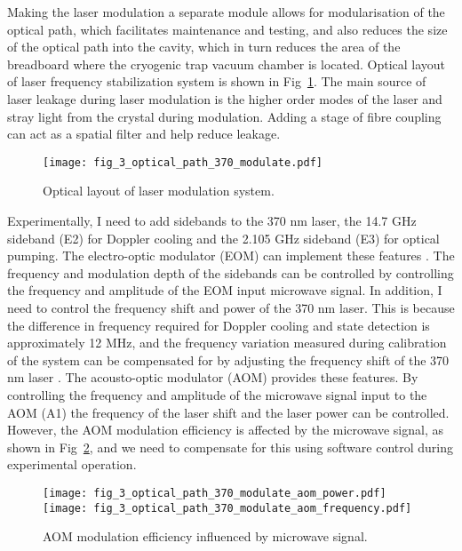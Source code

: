 Making the laser modulation a separate module allows for modularisation of the optical path, which facilitates maintenance and testing, and also reduces the size of the optical path into the cavity, which in turn reduces the area of the breadboard where the cryogenic trap vacuum chamber is located. Optical layout of laser frequency stabilization system \cite{RN147,RN149,RN146} is shown in Fig~\ref{fig:fig_3_optical_path_370_modulate}. The main source of laser leakage during laser modulation is the higher order modes of the laser and stray light from the crystal during modulation. Adding a stage of fibre coupling can act as a spatial filter and help reduce leakage.

\begin{figure}
    \centering
    \texttt{[image: fig\_3\_optical\_path\_370\_modulate.pdf]}
    \caption{Optical layout of laser modulation system.}
    \label{fig:fig_3_optical_path_370_modulate}
\end{figure}

Experimentally, I need to add sidebands to the 370 nm laser, the 14.7 GHz sideband (E2) for Doppler cooling and the 2.105 GHz sideband (E3) for optical pumping. The electro-optic modulator (EOM) can implement these features \cite{RN205,RN230,RN277}. The frequency and modulation depth of the sidebands can be controlled by controlling the frequency and amplitude of the EOM input microwave signal. In addition, I need to control the frequency shift and power of the 370 nm laser. This is because the difference in frequency required for Doppler cooling and state detection is approximately 12 MHz, and the frequency variation measured during calibration of the system can be compensated for by adjusting the frequency shift of the 370 nm laser \cite{RN144, RN141}. The acousto-optic modulator (AOM) provides these features. By controlling the frequency and amplitude of the microwave signal input to the AOM (A1) the frequency of the laser shift and the laser power can be controlled. However, the AOM modulation efficiency is affected by the microwave signal, as shown in Fig~\ref{fig:fig_3_optical_path_370_modulate_aom}, and we need to compensate for this using software control during experimental operation.

\begin{figure}
    \centering
    {\texttt{[image: fig\_3\_optical\_path\_370\_modulate\_aom\_power.pdf]}}
    {\texttt{[image: fig\_3\_optical\_path\_370\_modulate\_aom\_frequency.pdf]}}
    \caption{AOM modulation efficiency influenced by microwave signal.}
    \label{fig:fig_3_optical_path_370_modulate_aom}
\end{figure}


